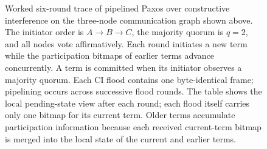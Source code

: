 \documentclass[journal]{IEEEtran}
\begin{document}
\begin{figure}[!t]
{%
}
\caption{Worked six-round trace of pipelined Paxos over constructive
interference on the three-node communication graph shown above. The
initiator order is $A\rightarrow B\rightarrow C$, the majority quorum is
$q=2$, and all nodes vote affirmatively. Each round initiates a new term
while the participation bitmaps of earlier terms advance concurrently.
A term is committed when its initiator observes a majority quorum. Each
CI flood contains one byte-identical frame; pipelining occurs across
successive flood rounds. The table shows the local pending-state view after
each round; each flood itself carries only one bitmap for its current term.
Older terms accumulate participation information because each received
current-term bitmap is merged into the local state of the current and
earlier terms.}
\label{fig:paxos}
\end{figure}
\end{document}
